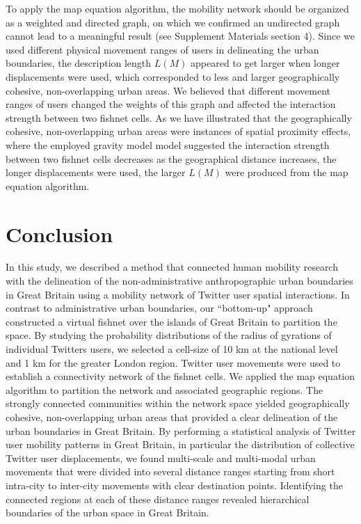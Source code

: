 \documentclass[]{tGIS2e}
\begin{document}
To apply the map equation algorithm, the mobility network should be organized as a weighted and directed graph, on which we confirmed an undirected graph cannot lead to a meaningful result (see Supplement Materials section 4).
Since we used different physical movement ranges of users in delineating the urban boundaries, the description length $L(M)$ appeared to get larger when longer displacements were used, which corresponded to less and larger geographically cohesive, non-overlapping urban areas.
We believed that different movement ranges of users changed the weights of this graph and affected the interaction strength between two fishnet cells.
As we have illustrated that the geographically cohesive, non-overlapping urban areas were instances of spatial proximity effects, where the employed gravity model model suggested the interaction strength between two fishnet cells decreases as the geographical distance increases, the longer displacements were used, the larger $L(M)$ were produced from the map equation algorithm.

\section{Conclusion}
In this study, we described a method that connected human mobility research with the delineation of the non-administrative anthropographic urban boundaries in Great Britain using a mobility network of Twitter user spatial interactions.
In contrast to administrative urban boundaries, our ``bottom-up" approach constructed a virtual fishnet over the islands of Great Britain to partition the space.
By studying the probability distributions of the radius of gyrations of individual Twitters users, we selected a cell-size of 10 km at the national level and 1 km for the greater London region.
Twitter user movements were used to establish a connectivity network of the fishnet cells.
We applied the map equation algorithm to partition the network and associated geographic regions.
The strongly connected communities within the network space yielded geographically cohesive, non-overlapping urban areas that provided a clear delineation of the urban boundaries in Great Britain.
By performing a statistical analysis of Twitter user mobility patterns in Great Britain, in particular the distribution of collective Twitter user displacements, we found multi-scale and multi-modal urban movements that were divided into several distance ranges starting from short intra-city to inter-city movements with clear destination points.
Identifying the connected regions at each of these distance ranges revealed hierarchical boundaries of  the urban space in Great Britain.
\end{document}
